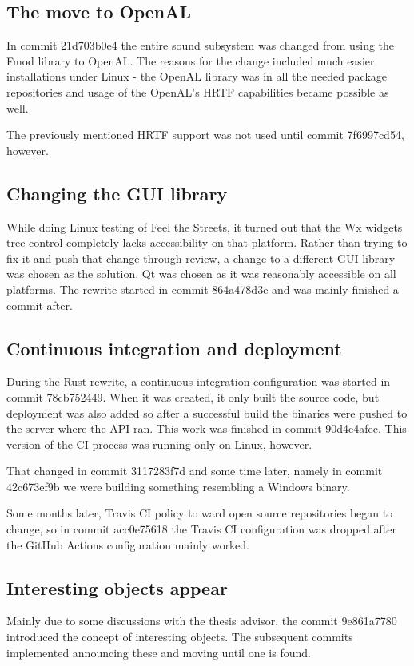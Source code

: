 \documentclass[nolof,digital]{fithesis3}
\begin{document}
\subsection{The move to OpenAL}
In commit 21d703b0e4 the entire sound subsystem was changed from using the Fmod library to OpenAL. The reasons for the change included much easier installations under Linux - the OpenAL library was in all the needed package repositories and usage of the OpenAL's HRTF capabilities became possible as well.

The previously mentioned HRTF support was not used until commit 7f6997cd54, however.
\subsection{Changing the GUI library}
While doing Linux testing of Feel the Streets, it turned out that the Wx widgets tree control completely lacks accessibility on that platform. Rather than trying to fix it and push that change through review, a change to a different GUI library was chosen as the solution. Qt was chosen as it was reasonably accessible on all platforms. The rewrite started in commit 864a478d3e and was mainly finished a commit after.
\subsection{Continuous integration and deployment}
During the Rust rewrite, a continuous integration configuration was started in commit 78cb752449. When it was created, it only built the source code, but deployment was also added so after a successful build the binaries were pushed to the server where the API ran. This work was finished in commit 90d4e4afec. This version of the CI process was running only on Linux, however.

That changed in commit 3117283f7d and some time later, namely in commit 42c673ef9b we were building something resembling a Windows binary.

Some months later, Travis CI policy to ward open source repositories began to change, so in commit acc0e75618 the Travis CI configuration was dropped after the GitHub Actions configuration mainly worked.
\subsection{Interesting objects appear}
Mainly due to some discussions with the thesis advisor, the commit 9e861a7780 introduced the concept of interesting objects. The subsequent commits implemented announcing these and moving until one is found.
\end{document}
